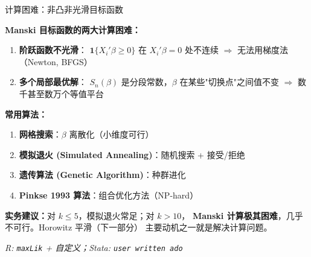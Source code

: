 \documentclass[aspectratio=169, 10pt]{beamer}
\begin{document}
\begin{frame}{计算困难：非凸非光滑目标函数}

  \textbf{Manski 目标函数的两大计算困难：}

  \begin{enumerate}\setlength{\itemsep}{2pt}
    \item \textbf{阶跃函数不光滑}：
    $\mathbf{1}\{X_i'\beta \geq 0\}$ 在 $X_i'\beta = 0$ 处不连续 $\Rightarrow$
    无法用梯度法（Newton, BFGS）

    \item \textbf{多个局部最优解}：
    $S_n(\beta)$ 是分段常数，$\beta$ 在某些"切换点"之间值不变 $\Rightarrow$
    数千甚至数万个等值平台
  \end{enumerate}

  \begin{highlightbox}
    \textbf{常用算法：}
    \begin{enumerate}\setlength{\itemsep}{1pt}
      \item \textbf{网格搜索}：$\beta$ 离散化（小维度可行）
      \item \textbf{模拟退火 (Simulated Annealing)}：随机搜索 + 接受/拒绝
      \item \textbf{遗传算法 (Genetic Algorithm)}：种群进化
      \item \textbf{Pinkse 1993 算法}：组合优化方法（NP-hard）
    \end{enumerate}
  \end{highlightbox}

  \begin{keybox}
    \textbf{实务建议：}对 $k \leq 5$，模拟退火常足；对 $k > 10$，
    \textbf{Manski 计算极其困难}，几乎不可行。Horowitz 平滑（下一部分）
    主要动机之一就是解决计算问题。
  \end{keybox}

  \hfill{\scriptsize\textit{R: \texttt{maxLik} + 自定义；Stata: \texttt{user written ado}}}

\end{frame}
\end{document}
